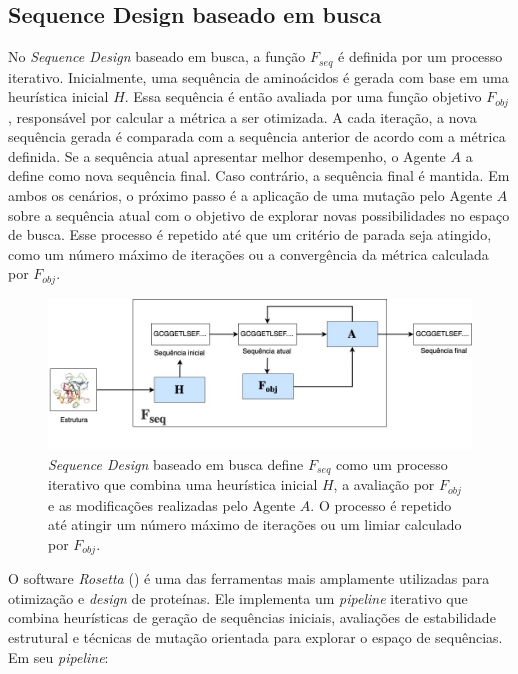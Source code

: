 \subsection{Sequence Design baseado em busca}

No \textit{Sequence Design} baseado em busca, 
a função $F_{seq}$ é definida por um processo iterativo. 
Inicialmente, uma sequência de aminoácidos é gerada com base em uma heurística inicial $H$.
Essa sequência é então avaliada por uma função objetivo $F_{obj}$, 
responsável por calcular a métrica a ser otimizada.
A cada iteração, 
a nova sequência gerada é comparada com a sequência anterior de acordo com a métrica definida. 
Se a sequência atual apresentar melhor desempenho, o Agente $A$ a define como nova sequência final.
Caso contrário, a sequência final é mantida. 
Em ambos os cenários, o próximo passo é a aplicação de uma mutação pelo Agente $A$ sobre 
a sequência atual com o objetivo de explorar novas possibilidades no espaço de busca.
Esse processo é repetido até que um critério de parada seja atingido, 
como um número máximo de iterações ou a convergência da métrica calculada por $F_{obj}$.


\begin{figure}[H]
  \centering
  \includegraphics[width=.8\textwidth]{figuras/metodologia-SearchBased.jpg}
  \caption[\textit{Sequence Design} baseado em busca]{\textit{Sequence Design} baseado em busca define $F_{seq}$ 
           como um processo iterativo que combina uma 
           heurística inicial $H$, a avaliação por $F_{obj}$ e as modificações realizadas pelo Agente $A$. 
           O processo é repetido até atingir um número máximo de iterações ou um limiar calculado por $F_{obj}$.}
  \label{fig:seqdes_search_based}
\end{figure}

O software \textit{Rosetta} (\cite{Rosetta}) é uma das ferramentas 
mais amplamente utilizadas para otimização e \textit{design} de proteínas.
Ele implementa um \textit{pipeline} iterativo que combina heurísticas de geração de sequências iniciais, 
avaliações de estabilidade estrutural e técnicas de mutação orientada para explorar o espaço de sequências.
Em seu \textit{pipeline}:


